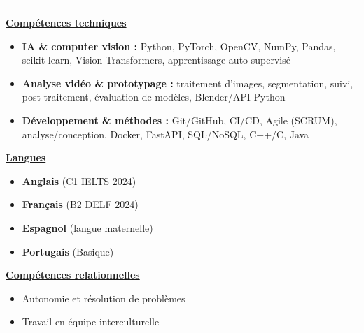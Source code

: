 \documentclass[letterpaper,10pt]{article}
\begin{document}
  

\vspace{4pt}
\noindent\rule{\textwidth}{0.4pt}
\vspace{0.4pt}

\noindent
\begin{minipage}[t]{0.39\textwidth}
  \raggedright
  \textbf{\underline{Compétences techniques}}\\[-2pt]
  {\scriptsize
    \begin{itemize}[leftmargin=*,itemsep=1pt,parsep=0pt,topsep=0pt,partopsep=0pt]
      \item \textbf{IA \& computer vision :} Python, PyTorch, OpenCV, NumPy, Pandas, scikit-learn, Vision Transformers, apprentissage auto-supervisé
      \item \textbf{Analyse vidéo \& prototypage :} traitement d'images, segmentation, suivi, post-traitement, évaluation de modèles, Blender/API Python
      \item \textbf{Développement \& méthodes :} Git/GitHub, CI/CD, Agile (SCRUM), analyse/conception, Docker, FastAPI, SQL/NoSQL, C++/C, Java
    \end{itemize}
  }
\end{minipage}\hfill
\begin{minipage}[t]{0.28\textwidth}
  \raggedright
  \textbf{\underline{Langues}}\\[-2pt]
  {\scriptsize
    \begin{itemize}[leftmargin=*,itemsep=0pt,parsep=0pt,topsep=0pt,partopsep=0pt]
      \item \textbf{Anglais} (C1 \textendash{} IELTS 2024)
      \item \textbf{Français} (B2 \textendash{} DELF 2024)
      \item \textbf{Espagnol} (langue maternelle)
      \item \textbf{Portugais} (Basique)
    \end{itemize}
  }

  \vspace{0.12cm}
  \textbf{\underline{Compétences relationnelles}}\\[-2pt]
  {\scriptsize
    \begin{itemize}[leftmargin=*,itemsep=1pt,parsep=0pt,topsep=0pt,partopsep=0pt]
      \item Autonomie et résolution de problèmes
      \item Travail en équipe interculturelle
    \end{itemize}
  }
\end{minipage}\hfill
\end{document}
